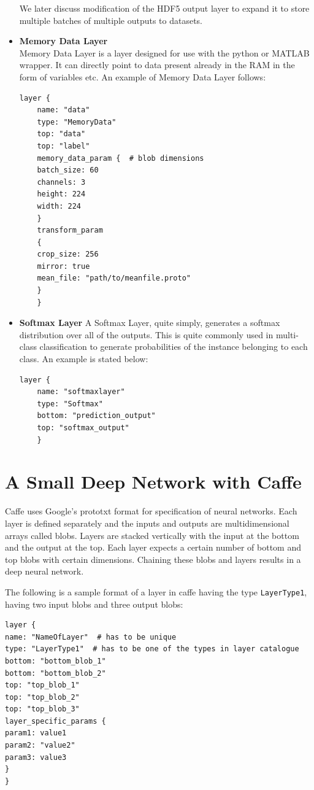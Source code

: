 \documentclass{article}
\begin{document}
\begin{itemize}
	We later discuss modification of the HDF5 output layer to expand it to store multiple batches of multiple outputs to datasets.
	
	\item \textbf{Memory Data Layer}\\
	Memory Data Layer is a layer designed for use with the python or MATLAB wrapper. It can directly point to data present already in the RAM in the form of variables etc. An example of Memory Data Layer follows:
	\begin{lstlisting}[tabsize=2,breaklines=true]
	layer {
	name: "data"
	type: "MemoryData"
	top: "data"
	top: "label"
	memory_data_param {  # blob dimensions
	batch_size: 60
	channels: 3
	height: 224
	width: 224
	}
	transform_param
	{
	crop_size: 256
	mirror: true
	mean_file: "path/to/meanfile.proto"
	}
	}
	\end{lstlisting}
	
	\item \textbf{Softmax Layer}
	A Softmax Layer, quite simply, generates a softmax distribution over all of the outputs. This is quite commonly used in multi-class classification to generate probabilities of the instance belonging to each class. An example is stated below:
	\begin{lstlisting}[tabsize=2,breaklines=true]
	layer { 
	name: "softmaxlayer" 
	type: "Softmax" 
	bottom: "prediction_output"
	top: "softmax_output"  
	} 
	\end{lstlisting}
\end{itemize}

\section{A Small Deep Network with Caffe}
Caffe uses Google's prototxt format for specification of neural networks. Each layer is defined separately and the inputs and outputs are multidimensional arrays called blobs. Layers are stacked vertically with the input at the bottom and the output at the top. Each layer expects a certain number of bottom and top blobs with certain dimensions. Chaining these blobs and layers results in a deep neural network.
\par
The following is a sample format of a layer in caffe having the type \verb|LayerType1|, having two input blobs and three output blobs:
\begin{lstlisting}[tabsize=2,breaklines=true]
layer {
name: "NameOfLayer"  # has to be unique
type: "LayerType1"  # has to be one of the types in layer catalogue
bottom: "bottom_blob_1"
bottom: "bottom_blob_2"
top: "top_blob_1"
top: "top_blob_2"
top: "top_blob_3"
layer_specific_params {
param1: value1
param2: "value2"
param3: value3
}
}
\end{lstlisting}
\end{document}
